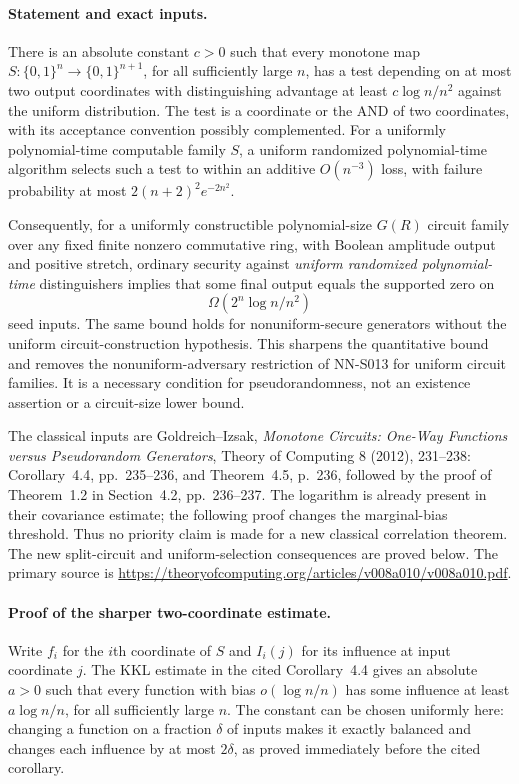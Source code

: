 \paragraph{Statement and exact inputs.}
There is an absolute constant $c>0$ such that every monotone map
$S:\{0,1\}^n\to\{0,1\}^{n+1}$, for all sufficiently large $n$,
has a test depending on at most two output coordinates with distinguishing
advantage at least $c\log n/n^2$ against the uniform distribution.
The test is a coordinate or the AND of two coordinates, with its
acceptance convention possibly complemented. For a uniformly
polynomial-time computable family $S$, a uniform randomized polynomial-time
algorithm selects such a test to within an additive $O(n^{-3})$ loss,
with failure probability at most $2(n+2)^2e^{-2n^2}$.

Consequently, for a uniformly constructible polynomial-size $G(R)$ circuit
family over any fixed finite nonzero commutative ring, with Boolean
amplitude output and positive stretch, ordinary security against
\emph{uniform randomized polynomial-time} distinguishers implies that
some final output equals the supported zero on
\[
                 \Omega(2^n\log n/n^2)
\]
seed inputs. The same bound holds for nonuniform-secure generators without
the uniform circuit-construction hypothesis. This sharpens the quantitative
bound and removes the nonuniform-adversary restriction of NN-S013 for
uniform circuit families. It is a necessary condition for pseudorandomness,
not an existence assertion or a circuit-size lower bound.

The classical inputs are Goldreich--Izsak, \emph{Monotone Circuits:
One-Way Functions versus Pseudorandom Generators}, Theory of Computing
8 (2012), 231--238: Corollary~4.4, pp.~235--236, and Theorem~4.5,
p.~236, followed by the proof of Theorem~1.2 in Section~4.2,
pp.~236--237. The logarithm is already present in their covariance
estimate; the following proof changes the marginal-bias threshold.
Thus no priority claim is made for a new classical correlation theorem.
The new split-circuit and uniform-selection consequences are proved below.
The primary source is
\url{https://theoryofcomputing.org/articles/v008a010/v008a010.pdf}.

\paragraph{Proof of the sharper two-coordinate estimate.}
Write $f_i$ for the $i$th coordinate of $S$ and $I_i(j)$ for its
influence at input coordinate $j$. The KKL estimate in the cited
Corollary~4.4 gives an absolute $a>0$ such that every function with bias
$o(\log n/n)$ has some influence at least $a\log n/n$, for all
sufficiently large $n$. The constant can be chosen uniformly here:
changing a function on a fraction $\delta$ of inputs makes it exactly
balanced and changes each influence by at most $2\delta$, as proved
immediately before the cited corollary.

